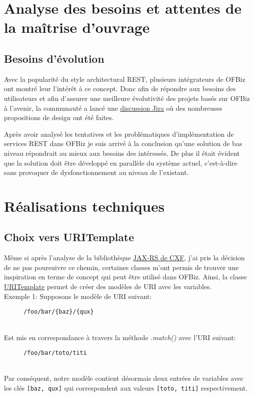\section{Analyse des besoins et attentes de la maîtrise d'ouvrage}
\subsection{Besoins d'évolution}
Avec la popularité du style architectural REST, plusieurs intégrateurs de OFBiz ont montré leur l'intérêt à ce concept. 
Donc afin de répondre aux besoins des utilisateurs et afin d'assurer une meilleure évolutivité des projets basés sur OFBiz à l'avenir, la communauté a lancé une  \href{https://issues.apache.org/jira/browse/OFBIZ-4274}{discussion Jira} où des nombreuses propositions de design ont été faites. 

Après avoir analysé les tentatives et les problématiques d'implémentation de services REST dans OFBiz je suis arrivé à la conclusion qu'une solution de bas niveau répondrait au mieux aux besoins des intéressés. De plus il était évident que la solution doit être développé en parallèle du système actuel, c'est-à-dire sans provoquer de dysfonctionnement au niveau de l'existant.




\section{Réalisations techniques}
\subsection{Choix vers URITemplate}
Même si après l'analyse de la bibliothèque \href{http://cxf.apache.org/docs/jax-rs.html}{JAX-RS de CXF}, j'ai pris la décision de ne pas poursuivre ce chemin, certaines classes m'ont permis de trouver une inspiration en terme de concept qui peut être utilisé dans OFBiz. Ainsi, la classe \href{https://cxf.apache.org/javadoc/latest/org/apache/cxf/jaxrs/model/URITemplate.html}{URITemplate}  permet de créer des modèles de URI avec les variables. \\
Exemple 1: 
Supposons le modèle de URI suivant:
\begin{figure}[h!]
	\begin{lstlisting}[frame=leftline]
/foo/bar/{baz}/{qux}
	\end{lstlisting}
\end{figure}
\\Est mis en correspondance à travers la méthode \emph{.match()} avec l'URI suivant:
\begin{figure}[h!]
	\begin{lstlisting}[frame=leftline]
/foo/bar/toto/titi
	\end{lstlisting}
\end{figure}\\
Par conséquent, notre modèle contient désormais deux entrées de variables avec les clés \verb|[baz, qux]| qui correspondent aux valeurs \verb|[toto, titi]| respectivement. 

